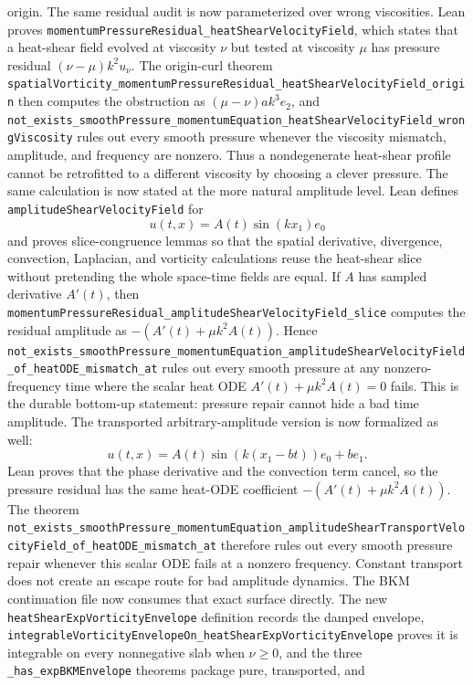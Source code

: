 \documentclass[11pt]{article}
\theoremstyle{remark}
\begin{document}
origin.
The same residual audit is now parameterized over wrong viscosities.  Lean
proves
\texttt{momentumPressureResidual\_heatShearVelocityField}, which states that a
heat-shear field evolved at viscosity \(\nu\) but tested at viscosity \(\mu\)
has pressure residual \((\nu-\mu)k^2u_\nu\).  The origin-curl theorem
\texttt{spatialVorticity\_momentumPressureResidual\_heatShearVelocityField\_origin}
then computes the obstruction as \((\mu-\nu)ak^3e_2\), and
\texttt{not\_exists\_smoothPressure\_momentumEquation\_heatShearVelocityField\_wrongViscosity}
rules out every smooth pressure whenever the viscosity mismatch, amplitude, and
frequency are nonzero.  Thus a nondegenerate heat-shear profile cannot be
retrofitted to a different viscosity by choosing a clever pressure.
The same calculation is now stated at the more natural amplitude level.  Lean
defines
\texttt{amplitudeShearVelocityField} for
\[
  u(t,x)=A(t)\sin(kx_1)e_0
\]
and proves slice-congruence lemmas so that the spatial derivative, divergence,
convection, Laplacian, and vorticity calculations reuse the heat-shear slice
without pretending the whole space-time fields are equal.  If \(A\) has sampled
derivative \(A'(t)\), then
\texttt{momentumPressureResidual\_amplitudeShearVelocityField\_slice} computes
the residual amplitude as \(-(A'(t)+\mu k^2A(t))\).  Hence
\texttt{not\_exists\_smoothPressure\_momentumEquation\_amplitudeShearVelocityField\_of\_heatODE\_mismatch\_at}
rules out every smooth pressure at any nonzero-frequency time where the scalar
heat ODE \(A'(t)+\mu k^2A(t)=0\) fails.  This is the durable bottom-up statement:
pressure repair cannot hide a bad time amplitude.
The transported arbitrary-amplitude version is now formalized as well:
\[
  u(t,x)=A(t)\sin(k(x_1-bt))e_0+be_1 .
\]
Lean proves that the phase derivative and the convection term cancel, so the
pressure residual has the same heat-ODE coefficient
\(-(A'(t)+\mu k^2A(t))\).  The theorem
\texttt{not\_exists\_smoothPressure\_momentumEquation\_amplitudeShearTransportVelocityField\_of\_heatODE\_mismatch\_at}
therefore rules out every smooth pressure repair whenever this scalar ODE fails
at a nonzero frequency.  Constant transport does not create an escape route for
bad amplitude dynamics.
The BKM continuation file now consumes that exact surface directly.  The new
\texttt{heatShearExpVorticityEnvelope} definition records the damped envelope,
\texttt{integrableVorticityEnvelopeOn\_heatShearExpVorticityEnvelope} proves it
is integrable on every nonnegative slab when \(\nu\ge 0\), and the three
\texttt{\_has\_expBKMEnvelope} theorems package pure, transported, and
\end{document}
